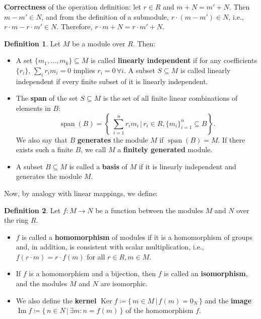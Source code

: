 \documentclass{article}
\newif\ifusemulticols
\newcommand\newterm[1]{\textbf{#1}}
\theoremstyle{definition}
\newtheorem{deff}{Definition}
\theoremstyle{remark}
\theoremstyle{plain}
\theoremstyle{plain}
\newenvironment{mymulticols}
    { \ifusemulticols \begin{multicols}{2} \fi }
    { \ifusemulticols \end{multicols} \fi }
\DeclareMathOperator{\vecspan}{span}
\DeclareMathOperator{\Ker}{Ker}
\DeclareMathOperator{\image}{Im}
\begin{document}
\begin{mymulticols}
\textbf{Correctness} of the operation definition: let $r \in R$ and $m + N = m' + N$.
Then $m - m' \in N$, and from the definition of a submodule, $r \cdot (m - m') \in N$, i.e., $r \cdot m - r \cdot m' \in N$. Therefore, $r\cdot m + N = r\cdot m' + N$.

\begin{deff}
    Let $M$ be a module over $R$. Then:
    \begin{itemize}
        \item A set $\{m_1, \dots, m_k\} \subseteq M$ is called \newterm{linearly independent} if for any coefficients $\{r_i\}$, $\sum_i r_i m_i = 0$ implies $r_i = 0 \, \forall i$. A subset $S \subseteq M$ is called linearly independent if every finite subset of it is linearly independent.

        \item The \newterm{span} of the set $S \subseteq M$ is the set of all finite linear combinations of elements in $B$: 
          $$\vecspan(B)=\left\{\; \sum_{i=1}^n r_i m_i \,\Big|\, r_i \in R, \{m_i\}_{i=1}^n \subseteq B \right\}.$$
          We also say that $B$ \newterm{generates} the module $M$ if $\vecspan(B) = M$. 
          If there exists such a finite $B$, we call $M$ a \newterm{finitely generated} module.
        \item A subset $B \subseteq M$ is called a \newterm{basis} of $M$ if it is linearly independent and generates the module $M$.
    \end{itemize}
\end{deff}

Now, by analogy with linear mappings, we define:

\begin{deff}
    Let $f: M \to N$ be a function between the modules $M$ and $N$ over the ring $R$.
    \begin{itemize}
        \item $f$ is called a \newterm{homomorphism} of modules if it is a homomorphism of groups
            and, in addition, is consistent with scalar multiplication, i.e., $f(r \cdot m) = r \cdot
            f(m)$ for all $r \in R, m \in M$.
        \item If $f$ is a homomorphism and a bijection, then $f$ is called an \newterm{isomorphism},
            and the modules $M$ and $N$ are isomorphic.

        \item We also define the \newterm{kernel} $\Ker f \coloneqq \{\, m \in M \,|\, f(m) = 0_N \,
            \}$ and the \newterm{image} $\image f \coloneqq \{\, n \in N \,|\, \exists m: n = f(m) \,
            \}$ of the homomorphism $f$.
    \end{itemize}
\end{deff}


\end{mymulticols}
\end{document}
